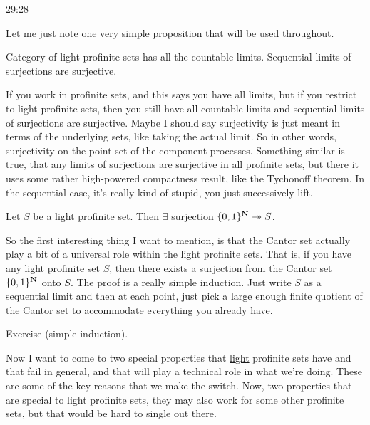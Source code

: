 \begin{example}
\begin{unfinished}{29:28}
\begin{remark}
\begin{proposition}
\begin{enumerate}
\end{enumerate}

\end{proposition}

Let me just note one very simple proposition that will be used throughout. 
\begin{proposition}

Category of light profinite sets has all the countable limits. Sequential limits of surjections are surjective.

\end{proposition}

If you work in profinite sets, and this says you have all limits, but if you restrict to light profinite sets, then you still have all countable limits and sequential limits of surjections are surjective. Maybe I should say surjectivity is just meant in terms of the underlying sets, like taking the actual limit. So in other words, surjectivity on the point set of the component processes. 
Something similar is true, that any limits of surjections are surjective in all profinite sets, but there it uses some rather high-powered compactness result, like the Tychonoff theorem. In the sequential case, it's really kind of stupid, you just successively lift.

\begin{proposition}
Let $S$ be a light profinite set. Then $\exists$ surjection $\{ 0,1 \}^{\mathbf N} \twoheadrightarrow S$.
\end{proposition}
So the first interesting thing I want to mention, is that the Cantor set actually play a bit of a universal role within the light profinite sets. That is, if you have any light profinite set $S$, then there exists a surjection from the Cantor set $\{ 0,1 \}^{\mathbf N}$ onto $S$. 
The proof is a really simple induction. Just write $S$ as a sequential limit and then at each point, just pick a large enough finite quotient of the Cantor set to accommodate everything you already have.

\begin{sketch}
Exercise (simple induction).
\end{sketch}

Now I want to come to two special properties that \underline{light} profinite sets have and that fail in general, and that will play a technical role in what we're doing. These are some of the key reasons that we make the switch. Now, two properties that are special to light profinite sets, they may also work for some other profinite sets, but that would be hard to single out there.


\end{remark}
\end{unfinished}
\end{example}
